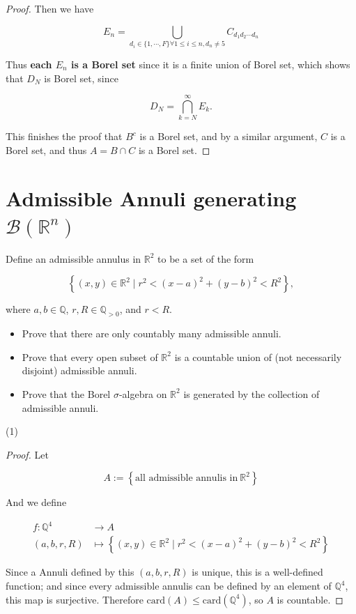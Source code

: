 \begin{proof}
Then we have

\[E_{n} = \bigcup\limits_{d_{i} \in {\{{1,\cdots,F}\}}\forall 1 \leq i \leq n,d_{n} \neq 5}C_{d_{1}d_{2}\cdots d_{n}}\]

Thus \textbf{each \(E_{n}\) is a Borel set} since it is a finite union of Borel set, which shows that \(D_{N}\) is Borel set, since

\[D_{N} = \bigcap\limits_{k = N}^{\infty}E_{k}.\]

This finishes the proof that \(B^{c}\) is a Borel set, and by a similar argument, \(C\) is a Borel set, and thus \(A = B \cap C\) is a Borel set.

\end{proof}

\section{\texorpdfstring{Admissible Annuli generating \(\mathcal{B}(\mathbb{R}^{n})\)}{Admissible Annuli generating \textbackslash mathcal\{B\}(\textbackslash mathbb\{R\}\^{}\{n\})}}\label{admissible-annuli-generating-mathcalbmathbbrn}

Define an admissible annulus in \(\mathbb{R}^{2}\) to be a set of the form

\[\left\{ {(x,y) \in \mathbb{R}^{2} \mid r^{2} < (x - a)^{2} + (y - b)^{2} < R^{2}} \right\},\]

where \(a,b \in \mathbb{Q}\), \(r,R \in \mathbb{Q}_{> 0}\), and \(r < R\).

\begin{itemize}
\item
  Prove that there are only countably many admissible annuli.
\item
  Prove that every open subset of \(\mathbb{R}^{2}\) is a countable union of (not necessarily disjoint) admissible annuli.
\item
  Prove that the Borel \(\sigma\)-algebra on \(\mathbb{R}^{2}\) is generated by the collection of admissible annuli.
\end{itemize}

(1)

\begin{proof}

Let

\[A := \left\{ {\text{all admissible annulis in}\ \mathbb{R}^{2}} \right\}\]

And we define

\[\begin{matrix}
{f:\mathbb{Q}^{4}} & {\rightarrow A} \\
{(a,b,r,R)} & {\mapsto\left\{ {(x,y) \in \mathbb{R}^{2} \mid r^{2} < (x - a)^{2} + (y - b)^{2} < R^{2}} \right\}}
\end{matrix}\]

Since a Annuli defined by this \((a,b,r,R)\) is unique, this is a well-defined function; and since every admissible annulis can be defined by an element of \(\mathbb{Q}^{4}\), this map is surjective. Therefore \(\text{card}(A) \leq \text{card}(\mathbb{Q}^{4})\), so \(A\) is countable.

\end{proof}

